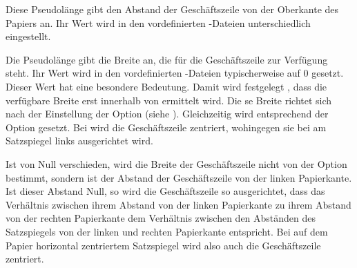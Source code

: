 \begin{Declaration}
\end{Declaration}
Diese Pseudolänge gibt den Abstand der Geschäftszeile von der Oberkante des
Papiers an. Ihr Wert wird in den vordefinierten
-Dateien
unterschiedlich eingestellt. %
%
\EndIndexGroup


\begin{Declaration}
\end{Declaration}
Die Pseudolänge  gibt die Breite an, die für die
Geschäftszeile zur Verfügung steht. Ihr Wert wird in den vordefinierten
-Dateien typischerweise auf 0
gesetzt. Dieser Wert hat eine besondere Bedeutung. %
\iffalse%
Es wird damit keineswegs festgelegt, dass für die Geschäftszeile keine Breite
zur Verfügung steht. Vielmehr bedeutet der Wert%
\else%
Damit wird festgelegt%
\fi%
, dass die verfügbare Breite erst innerhalb von
 ermittelt wird.  Die%
\iffalse%
\ dort ermittelte %
\else%
se %
\fi%
Breite richtet sich nach der Einstellung der Option
%
 (siehe
). Gleichzeitig wird 
 entsprechend der Option gesetzt. Bei
%
 wird die Geschäftszeile zentriert,
wohingegen sie bei %
 am Satzspiegel links ausgerichtet
wird.

Ist  von Null verschieden, wird die Breite der
Geschäftszeile nicht von der Option 
bestimmt, sondern  ist der Abstand der Geschäftszeile von der
linken Papierkante. Ist dieser Abstand Null, so wird die
Geschäftszeile so ausgerichtet, dass das Verhältnis zwischen ihrem Abstand von
der linken Papierkante zu ihrem Abstand von der rechten Papierkante dem
Verhältnis zwischen den Abständen des Satzspiegels von der linken und rechten
Papierkante entspricht. Bei auf dem Papier horizontal zentriertem Satzspiegel
wird also auch die Geschäftszeile zentriert.

